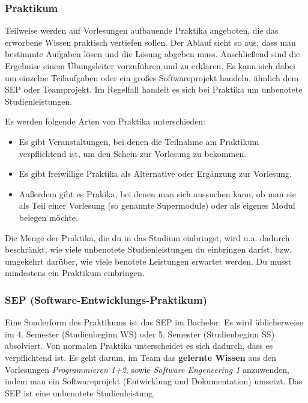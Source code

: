 	\subsubsection{Praktikum}
	Teilweise werden auf Vorlesungen aufbauende Praktika angeboten, die das erworbene Wissen praktisch vertiefen sollen. Der Ablauf sieht so aus, dass man bestimmte Aufgaben lösen und die Lösung abgeben muss. Anschließend sind die Ergebnise einem Übungsleiter vorzuführen und zu erklären. Es kann sich dabei um einzelne Teilaufgaben oder ein großes Softwareprojekt handeln, ähnlich dem SEP oder Teamprojekt. Im Regelfall handelt es sich bei Praktika um unbenotete Studienleistungen.

	Es werden folgende	Arten von Praktika unterschieden:
	
	\begin{itemize}
		\item Es gibt Veranstaltungen, bei denen die Teilnahme am Praktikum verpflichtend ist, um den Schein zur Vorlesung zu bekommen. 
		\item Es gibt freiwillige Praktika als Alternative oder Ergänzung zur Vorlesung.
		\item Außerdem gibt es Prakika, bei denen man sich aussuchen kann, ob man sie als Teil einer Vorlesung (so genannte Supermodule) oder als eigenes Modul belegen möchte.
	\end{itemize}

\noindent	Die Menge der Praktika, die du in das Studium einbringst, wird u.a. dadurch beschränkt, wie viele unbenotete Studienleistungen du einbringen darfst, bzw. umgekehrt darüber, wie viele benotete Leistungen erwartet werden. Du musst mindestens ein Praktikum einbringen.


	\subsubsection*{SEP (Software-Entwicklungs-Praktikum)}
	Eine Sonderform des Praktikums ist das SEP im Bachelor. Es wird üblicherweise im 4. Semester (Studienbeginn WS) oder 5. Semester (Studienbeginn SS) absolviert. Von normalen Praktika unterscheidet es sich dadurch, dass es verpflichtend ist. Es geht darum, im Team das \textbf{gelernte Wissen} aus den Vorlesungen \emph{Programmieren 1+2}, sowie \emph{Software Engeneering 1} anzuwenden, indem man ein Softwareprojekt (Entwicklung und Dokumentation) umsetzt. Das SEP ist eine unbenotete Studienleistung.


